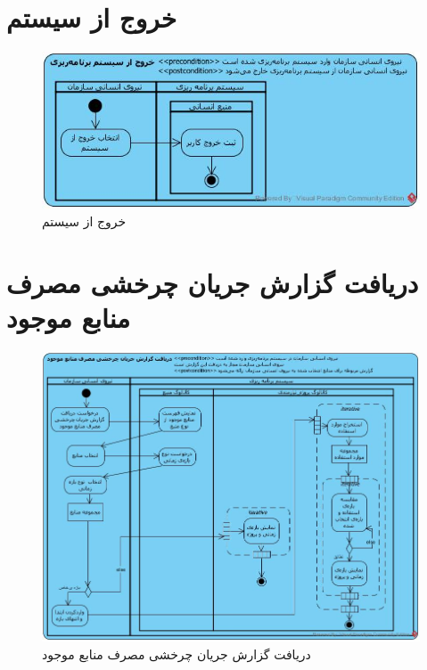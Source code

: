 \section{خروج از سیستم}
\begin{figure}[H]
	\centering
	\includegraphics[scale=0.8]{img/activity/SignOut}
	\caption{خروج از سیستم}
\end{figure}


\section{دریافت گزارش جریان چرخشی مصرف منابع موجود}
\begin{figure}[H]
	\centering
	\includegraphics[scale=0.55]{img/activity/UsageFlowReport}
	\caption{دریافت گزارش جریان چرخشی مصرف منابع موجود}
\end{figure}


\newpage
